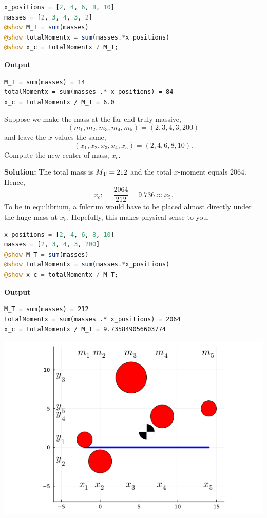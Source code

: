 \begin{lstlisting}[language=Julia,style=mystyle]
x_positions = [2, 4, 6, 8, 10]
masses = [2, 3, 4, 3, 2]
@show M_T = sum(masses)
@show totalMomentx = sum(masses.*x_positions)
@show x_c = totalMomentx / M_T;
\end{lstlisting}
\textbf{Output} 
\begin{verbatim}
M_T = sum(masses) = 14
totalMomentx = sum(masses .* x_positions) = 84
x_c = totalMomentx / M_T = 6.0
\end{verbatim}

\bigskip

\begin{example} Suppose we make the mass at the far end truly massive,
$$(m_1, m_2, m_3, m_4, m_5) = (2, 3, 4, 3, 200)$$
and leave the $x$ values the same,
$$(x_1, x_2, x_3, x_4, x_5) = (2, 4, 6, 8, 10).$$
Compute the new center of mass, $x_c$.
    
\end{example}

\textbf{Solution:}
The total mass is ${M_{\rm T}} = 212$ and the total $x$-moment equals $2064$. Hence, 
$$x_c: = \frac{2064}{212} = 9.736 \approx x_5.$$
To be in equilibrium, a fulcrum would have to be placed almost directly under the huge mass at $x_5$. Hopefully, this makes physical sense to you.

\begin{lstlisting}[language=Julia,style=mystyle]
x_positions = [2, 4, 6, 8, 10]
masses = [2, 3, 4, 3, 200]
@show M_T = sum(masses)
@show totalMomentx = sum(masses.*x_positions)
@show x_c = totalMomentx / M_T;
\end{lstlisting}
\textbf{Output} 
\begin{verbatim}
M_T = sum(masses) = 212
totalMomentx = sum(masses .* x_positions) = 2064
x_c = totalMomentx / M_T = 9.735849056603774
\end{verbatim}

\bigskip

\begin{center}
\includegraphics[width=0.6\columnwidth]{graphics/Chap03/discreteMassesBallsWithYpositions.png}%
\end{center}


